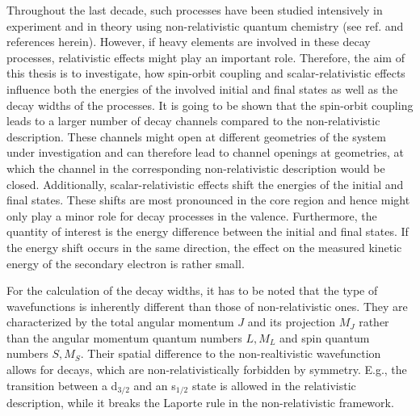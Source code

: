 Throughout the last decade, such processes have been studied intensively
in experiment 
and in theory using non-relativistic quantum chemistry
(see ref. \cite{Hergenhahn11} and references herein).
However, if heavy elements are involved in these decay processes, relativistic
effects might play an important role. Therefore, the aim of this
thesis is to investigate, how spin-orbit coupling and scalar-relativistic
effects influence both the energies of the involved initial and final states
as well as the decay widths of the processes.
It is going to be shown that the spin-orbit coupling leads to a larger number
of decay channels compared to the non-relativistic description. These channels
might open at different geometries of the system under investigation and
can therefore lead to channel openings at geometries, at which the channel
in the corresponding non-relativistic description would be closed. Additionally,
scalar-relativistic effects shift the energies of the initial and final states.
These shifts are most pronounced in the core region and hence might only play
a minor role for decay processes in the valence. Furthermore, the
quantity of interest is the energy difference between the initial and final
states. If the
energy shift occurs in the same direction, the effect on the measured kinetic
energy of the secondary electron is rather small.

For the calculation of the decay widths, it has to be noted that the type of
wavefunctions is inherently different than those of non-relativistic ones. They
are characterized by the total angular momentum $J$ and its projection $M_J$ rather
than the angular momentum quantum numbers $L,M_L$ and spin quantum numbers
$S,M_S$. Their spatial difference to the non-realtivistic wavefunction allows
for decays, which are non-relativistically forbidden by symmetry. E.g., the
transition between a d$_{3/2}$ and an s$_{1/2}$ state is allowed in the
relativistic description, while it breaks the Laporte rule in the non-relativistic
framework.

